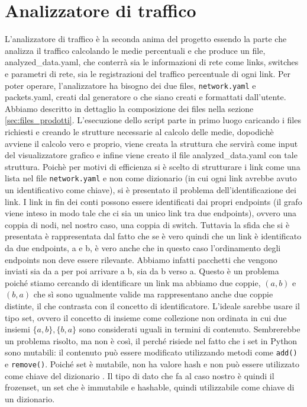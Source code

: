 \documentclass[binding=0.6cm]{sapthesis}
\begin{document}
\chapter{Analizzatore di traffico}
L'analizzatore di traffico è la seconda anima del progetto essendo la parte che analizza il traffico calcolando le medie percentuali e che produce
un file, analyzed\_data.yaml, che conterrà sia le informazioni di rete come links, switches e parametri di rete, sia le registrazioni del traffico percentuale
di ogni link. Per poter operare, l'analizzatore ha bisogno dei due files, \texttt{network.yaml} e packets.yaml, creati dal generatore o che siano
creati e formattati dall'utente. Abbiamo descritto in dettaglio la composizione dei files nella sezione \ref{sec:files_prodotti}.
L'esecuzione dello script parte in primo luogo caricando i files richiesti e creando le strutture necessarie al calcolo delle medie, dopodichè
avviene il calcolo vero e proprio, viene creata la struttura che servirà come input del visualizzatore grafico e infine viene creato il file
analyzed\_data.yaml con tale struttura.
Poichè per motivi di efficienza si è scelto di strutturare i link come una lista nel file \texttt{network.yaml} e non come dizionario (in cui ogni link avrebbe avuto un identificativo come chiave), si è presentato il problema dell'identificazione dei link.
I link in fin dei conti possono essere identificati dai propri endpoints (il grafo viene inteso in modo tale che ci sia un unico link tra due endpoints), ovvero una coppia di nodi,
nel nostro caso, una coppia di switch. Tuttavia la sfida che si è presentata è rappresentata dal fatto che se è vero quindi che un link è identificato
da due endpoints, a e b, è vero anche che in questo caso l'ordinamento degli endpoints non deve essere rilevante. Abbiamo infatti pacchetti
che vengono inviati sia da a per poi arrivare a b, sia da b verso a. Questo è un problema poiché stiamo cercando di identificare un link ma abbiamo
due coppie, \((a, b)\) e \((b, a)\) che sì sono ugualmente valide ma rappresentano anche due coppie distinte, il che contrasta con il concetto di identificatore. 
L'ideale sarebbe usare il tipo set, ovvero il concetto di insieme 
come collezione non ordinata in cui due insiemi \(\{a, b\}, \{b, a\}\) sono considerati uguali in termini di contenuto. Sembrerebbe un problema risolto, ma non è così, il perché risiede
nel fatto che i set in Python sono mutabili: il contenuto può essere modificato utilizzando metodi come \texttt{add()} e \texttt{remove()}. 
Poiché set è mutabile, non ha valore hash \cite{pythonGlossaryHashable} e non può essere utilizzato come chiave del dizionario \cite{pythonStdTypesMapping}.
Il tipo di dato che fa al caso nostro è quindi il frozenset, un set che è immutabile e hashable, quindi utilizzabile come chiave di un dizionario.
\end{document}
